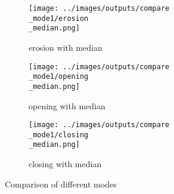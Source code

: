 \begin{figure}[!ht]
\begin{subfigure}[t]{0.22\textwidth}
    \texttt{[image: ../images/outputs/compare\\\_mode1/erosion\\\_median.png]}
    \caption{erosion with median}
    \centering
  \end{subfigure}
\begin{subfigure}[t]{0.22\textwidth}
    \texttt{[image: ../images/outputs/compare\\\_mode1/opening\\\_median.png]}
    \caption{opening with median}
    \centering
  \end{subfigure}
\begin{subfigure}[t]{0.22\textwidth}
    \texttt{[image: ../images/outputs/compare\\\_mode1/closing\\\_median.png]}
    \caption{closing with median}
    \centering
  \end{subfigure}
 \caption{Comparison of different modes}
 \end{figure}
